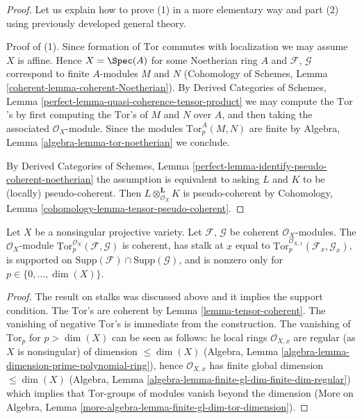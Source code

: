 \begin{proof}
Let us explain how to prove (1) in a more elementary way and part (2)
using previously developed general theory.

\medskip\noindent
Proof of (1). Since formation of $\text{Tor}$ commutes with localization
we may assume $X$ is affine. Hence $X = \Spec(A)$ for some Noetherian
ring $A$ and $\mathcal{F}$, $\mathcal{G}$ correspond to finite $A$-modules
$M$ and $N$ (Cohomology of Schemes, Lemma
\ref{coherent-lemma-coherent-Noetherian}).
By Derived Categories of Schemes, Lemma
\ref{perfect-lemma-quasi-coherence-tensor-product} we may
compute the $\text{Tor}$'s by first computing the $\text{Tor}$'s
of $M$ and $N$ over $A$, and then taking the associated $\mathcal{O}_X$-module.
Since the modules $\text{Tor}_p^A(M, N)$ are finite by
Algebra, Lemma \ref{algebra-lemma-tor-noetherian}
we conclude.

\medskip\noindent
By Derived Categories of Schemes, Lemma
\ref{perfect-lemma-identify-pseudo-coherent-noetherian}
the assumption is equivalent to asking $L$ and $K$ to be
(locally) pseudo-coherent. Then $L \otimes_{\mathcal{O}_X}^\mathbf{L} K$
is pseudo-coherent by
Cohomology, Lemma \ref{cohomology-lemma-tensor-pseudo-coherent}.
\end{proof}

\begin{lemma}
\label{lemma-compute-tor-nonsingular}
Let $X$ be a nonsingular projective variety.
Let $\mathcal{F}$, $\mathcal{G}$ be coherent $\mathcal{O}_X$-modules.
The $\mathcal{O}_X$-module
$\text{Tor}_p^{\mathcal{O}_X}(\mathcal{F}, \mathcal{G})$
is coherent, has stalk at $x$ equal to
$\text{Tor}_p^{\mathcal{O}_{X, x}}(\mathcal{F}_x, \mathcal{G}_x)$,
is supported on
$\text{Supp}(\mathcal{F}) \cap \text{Supp}(\mathcal{G})$, and
is nonzero only for $p \in \{0, \ldots, \dim(X)\}$.
\end{lemma}

\begin{proof}
The result on stalks was discussed above and it implies the support
condition. The $\text{Tor}$'s are coherent by
Lemma \ref{lemma-tensor-coherent}. The vanishing of negative
$\text{Tor}$'s is immediate from the construction. The
vanishing of $\text{Tor}_p$ for $p > \dim(X)$ can be seen as follows:
he local rings $\mathcal{O}_{X, x}$ are regular
(as $X$ is nonsingular) of dimension $\leq \dim(X)$
(Algebra, Lemma \ref{algebra-lemma-dimension-prime-polynomial-ring}),
hence $\mathcal{O}_{X, x}$ has finite global dimension $\leq \dim(X)$
(Algebra, Lemma \ref{algebra-lemma-finite-gl-dim-finite-dim-regular})
which implies that $\text{Tor}$-groups of modules vanish beyond the dimension
(More on Algebra, Lemma \ref{more-algebra-lemma-finite-gl-dim-tor-dimension}).
\end{proof}

